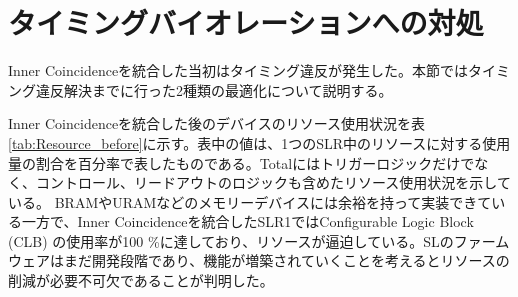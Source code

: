 \section{タイミングバイオレーションへの対処}
\label{sec:appendix:timing_violation}
Inner Coincidenceを統合した当初はタイミング違反が発生した。本節ではタイミング違反解決までに行った2種類の最適化について説明する。

Inner Coincidenceを統合した後のデバイスのリソース使用状況を表\ref{tab:Resource_before}に示す。表中の値は、1つのSLR中のリソースに対する使用量の割合を百分率で表したものである。Totalにはトリガーロジックだけでなく、コントロール、リードアウトのロジックも含めたリソース使用状況を示している。
BRAMやURAMなどのメモリーデバイスには余裕を持って実装できている一方で、Inner Coincidenceを統合したSLR1ではConfigurable Logic Block (CLB) の使用率が100 \%に達しており、リソースが逼迫している。SLのファームウェアはまだ開発段階であり、機能が増築されていくことを考えるとリソースの削減が必要不可欠であることが判明した。
